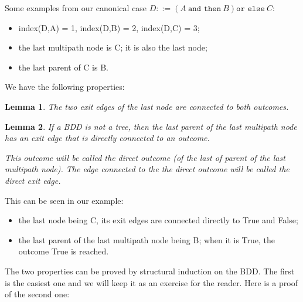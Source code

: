 \documentclass[a4paper,12pt,twoside]{article}
\newcommand{\andthen}{\texttt{and then}}
\newcommand{\orelse}{\texttt{or else}}
\newtheorem{lemma}{Lemma}[subsection]
\begin{document}
Some examples from our canonical case
$D ::= (A \ \andthen{} \ B) \orelse{} \ C$:
\begin{itemize}
\item index(D,A) = 1, index(D,B) = 2, index(D,C) = 3;
\item the last multipath node is C; it is also the last node;
\item the last parent of C is B.
\end{itemize}

We have the following properties:

\begin{lemma}
  \label{lemma:last-node}
  The two exit edges of the last node are connected to both outcomes.
\end{lemma}

\begin{lemma}
  \label{lemma:last-parent-of-the-last-multipath-node}
   If a BDD is not a tree, then the last parent of the last multipath node
   has an exit edge that is directly connected to an outcome.

   This outcome will be called the direct outcome (of the last of
   parent of the last multipath node). The edge connected to the the
   direct outcome will be called the direct exit edge.
\end{lemma}

This can be seen in our example:
\begin{itemize}
\item the last node being C, its exit edges are connected directly to True and
      False;
\item the last parent of the last multipath node being B; when it is True,
      the outcome True is reached.
\end{itemize}

The two properties can be proved by structural induction on the BDD.
The first is the easiest one and we will keep it as an exercise for the
reader. Here is a proof of the second one:
\end{document}

